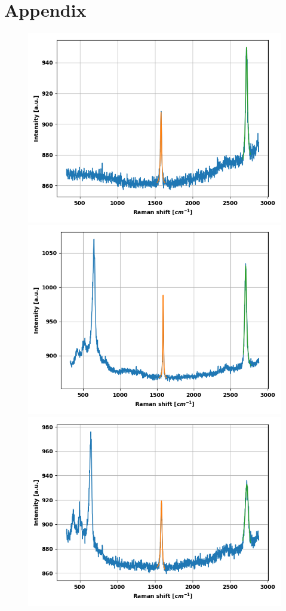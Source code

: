 \documentclass[12pt,a4paper]{article}
\begin{document}
\newpage
\section{Appendix}
\begin{figure}
\centering
\includegraphics[scale=0.5]{Bilder/part6/1.png}
\includegraphics[scale=0.5]{Bilder/part6/2.png}
\includegraphics[scale=0.5]{Bilder/part6/3.png}

\end{figure}
\end{document}
